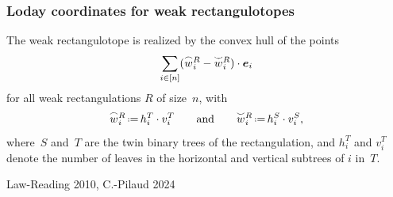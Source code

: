 \documentclass[11pt]{beamer}%
\newcommand{\green}{\color{darkgreen}}
\newcommand{\auth}[1]{{\green\hfill{\footnotesize #1}}}
\newcommand{\eqdef}{\mbox{\,\raisebox{0.2ex}{\scriptsize\ensuremath{\mathrm:}}\ensuremath{=}\,}} %
\renewcommand{\b}[1]{{\boldsymbol{#1}}} %
\newcommand{\loday}[1]{\smash{\overset{\frown}{#1}}}
\newcommand{\antiloday}[1]{\smash{\overset{\smile}{#1}}}
\begin{document}
\begin{frame}
  \frametitle{Loday coordinates for weak rectangulotopes}
  \begin{theorem}
  The weak rectangulotope is realized by the convex hull of the points
  \[
  \sum_{i\in [n]} (\loday{w}^R_i - \antiloday{w}^R_i)\cdot \b{e}_i
  \]
  for all weak rectangulations $R$ of size~$n$,
  with
  \[
    \loday{w}^R_i \eqdef h^T_i\cdot v^T_i
    \qquad\text{and}\qquad
    \antiloday{w}^R_i \eqdef h^S_i\cdot v^S_i,
  \]
  where~$S$ and~$T$ are the twin binary trees of the rectangulation, and $h^T_i$ and $v^T_i$ denote the number of leaves in the horizontal and vertical subtrees of $i$ in~$T$.
  \end{theorem}
  \auth{Law-Reading 2010, C.-Pilaud 2024}
\end{frame}

\end{document}
